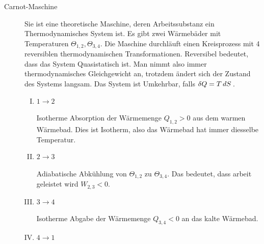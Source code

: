 \begin{description}
  \item[Carnot-Maschine] 
    Sie ist eine theoretische Maschine, deren Arbeitssubstanz
    ein Thermodynamisches System ist. Es gibt zwei W\"armeb\"ader mit Temperaturen
    $\Theta_{1,2}, \Theta_{3,4}$. Die Maschine durchl\"auft einen Kreisprozess mit
    4 reversiblen thermodynamischen Transformationen.
    Reversibel bedeutet, dass das System Quasistatisch ist. Man nimmt also 
    immer thermodynamisches Gleichgewicht an, trotzdem \"andert sich der Zustand des Systems
    langsam.
    Das System ist Umkehrbar, falls $\delta Q = T \,dS\,$.
    \begin{enumerate}[I)]
      \item $1\to2$ 
        
        Isotherme Absorption der W\"armemenge $Q_{1,2} > 0$ aus dem warmen
        W\"armebad. Dies ist Isotherm, also das W\"armebad hat immer diesselbe Temperatur.

      \item $2\to3$
        
        Adiabatische Abk\"uhlung von $\Theta_{1,2}$ zu $\Theta_{3,4}$.
        Das bedeutet, dass arbeit geleistet wird $W_{2,3} < 0$.

      \item $3\to4$

        Isotherme Abgabe der W\"armemenge $Q_{3,4} < 0$ an das kalte W\"armebad.

      \item $4\to1$


\end{enumerate}
\end{description}

